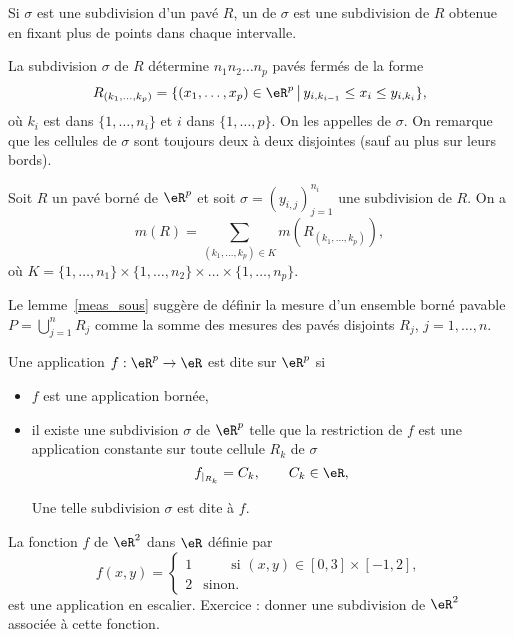 \begin{definition}
	Si \( \sigma\) est une subdivision d'un pavé \( R\), un  de \( \sigma\) est une subdivision de \( R\) obtenue en fixant plus de points dans chaque intervalle.
\end{definition}

La subdivision \( \sigma\) de \( R\) détermine \( n_1n_2\ldots n_p\) pavés fermés de la forme
\[
	R_{(k_1,\ldots,k_p)}=\{(x_1,\ldots, x_p)\in\eR^p\,\big\vert\, y_{i,k_{i-1}}\leq x_i\leq y_{i,k_i}\},
\]
où \( k_i\) est dans \( \{1,\ldots, n_i\}\) et \( i\) dans \( \{1,\ldots, p\}\). On les appelles  de \( \sigma\). On remarque que les cellules de \( \sigma\) sont toujours deux à deux disjointes (sauf au plus sur leurs bords).
\begin{lemma}\label{meas_sous}
	Soit \( R\) un pavé borné de \( \eR^p\) et soit \( \sigma=(y_{i,j})_{j=1}^{n_i}\) une subdivision de \( R\).
	On a
	\[
		m(R)=\sum_{(k_1,\ldots,k_p)\in K} m(R_{(k_1,\ldots,k_p)}),
	\]
	où \( K=\{1,\ldots,n_1\}\times\{1,\ldots,n_2\}\times\ldots \times\{1,\ldots,n_p\}\).
\end{lemma}
Le lemme~\ref{meas_sous} suggère de définir la mesure d'un ensemble borné pavable \( P=\bigcup_{j=1}^{n}R_j\) comme la somme des mesures des pavés disjoints \( R_j\), \( j=1,\ldots, n\).
\begin{definition}
	Une application \( f:\eR^p\to\eR\) est dite  sur \( \eR^p\) si
	\begin{itemize}
		\item \( f\) est une application bornée,
		\item il existe une subdivision \( \sigma\) de \( \eR^p\) telle que la restriction de \( f\)  est une application constante sur toute cellule \( R_k\) de \( \sigma\)
		      \[
			      f_{\vert_{R_k}}=C_k, \qquad C_k\in\eR,
		      \]

		      Une telle subdivision \( \sigma\) est dite  à \( f\).
	\end{itemize}
\end{definition}
\begin{example}
	La fonction \( f\) de \( \eR^2\) dans \( \eR\) définie par
	\begin{equation}
		f(x,y)=\left\{
		\begin{array}{ll}
			1 & \qquad \textrm{si } (x,y) \in [0,3]\times[-1,2], \\
			2 & \textrm{sinon.}
		\end{array}\right.
	\end{equation}
	est une application en escalier. Exercice : donner une subdivision de \( \eR^2\) associée à cette fonction.
\end{example}

